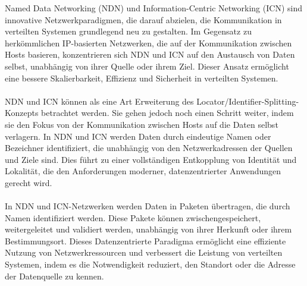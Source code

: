 \documentclass[../vs-script-first-v01.tex]{subfiles}
\begin{document}
Named Data Networking (NDN) und Information-Centric Networking (ICN) sind innovative Netzwerkparadigmen, die darauf abzielen, die Kommunikation in verteilten Systemen grundlegend neu zu gestalten. Im Gegensatz zu herkömmlichen IP-basierten Netzwerken, die auf der Kommunikation zwischen Hosts basieren, konzentrieren sich NDN und ICN auf den Austausch von Daten selbst, unabhängig von ihrer Quelle oder ihrem Ziel. Dieser Ansatz ermöglicht eine bessere Skalierbarkeit, Effizienz und Sicherheit in verteilten Systemen.
\\\\
NDN und ICN können als eine Art Erweiterung des Locator/Identifier-Splitting-Konzepts betrachtet werden. Sie gehen jedoch noch einen Schritt weiter, indem sie den Fokus von der Kommunikation zwischen Hosts auf die Daten selbst verlagern. In NDN und ICN werden Daten durch eindeutige Namen oder Bezeichner identifiziert, die unabhängig von den Netzwerkadressen der Quellen und Ziele sind. Dies führt zu einer vollständigen Entkopplung von Identität und Lokalität, die den Anforderungen moderner, datenzentrierter Anwendungen gerecht wird.
\\\\
In NDN und ICN-Netzwerken werden Daten in Paketen übertragen, die durch Namen identifiziert werden. Diese Pakete können zwischengespeichert, weitergeleitet und validiert werden, unabhängig von ihrer Herkunft oder ihrem Bestimmungsort. Dieses Datenzentrierte Paradigma ermöglicht eine effiziente Nutzung von Netzwerkressourcen und verbessert die Leistung von verteilten Systemen, indem es die Notwendigkeit reduziert, den Standort oder die Adresse der Datenquelle zu kennen.

\label{Woche08}
\end{document}
